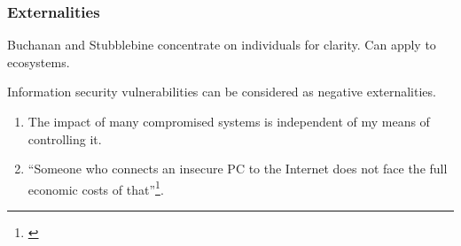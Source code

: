 \documentclass[handout, notes=hide]{beamer}
\newcommand{\prescite}[1]{\footnote{\cite{#1}}}
\begin{document}

\begin{frame}
\frametitle{Externalities}
\setlength{\parskip}{0.5em}

Buchanan and Stubblebine concentrate on individuals for clarity. Can apply to ecosystems.

Information security vulnerabilities can be considered as negative externalities.
\begin{enumerate}
\item The impact of many compromised systems is independent of my means of controlling it.
\item ``Someone who connects an insecure PC to the Internet does not face the full economic costs of that''\prescite{anderson2009}.
\end{enumerate}
\end{frame}


\end{document}
